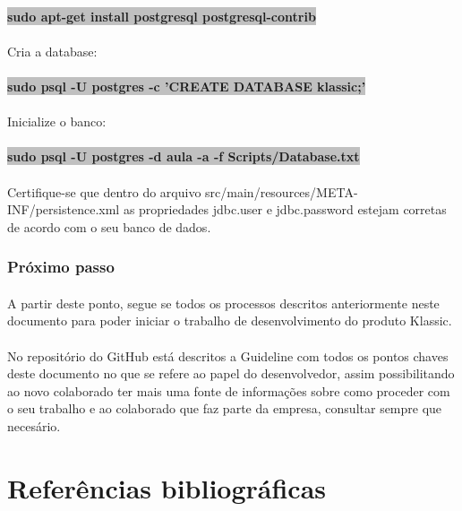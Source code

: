 \documentclass[	DIV=calc,%
							paper=a4,%
							fontsize=12pt,%
							onecolumn]{scrartcl}	 					%
\begin{document}
\paragraph{}
\textbf{\colorbox{Silver}{sudo apt-get install postgresql postgresql-contrib}}
\paragraph{}
Cria a database:
\paragraph{}
\textbf{\colorbox{Silver}{sudo psql -U postgres -c ’CREATE DATABASE klassic;’}}
\paragraph{}
Inicialize o banco:
\paragraph{}
\textbf{\colorbox{Silver}{sudo psql -U postgres -d aula -a -f Scripts/Database.txt}}
\paragraph{}
Certifique-se que dentro do arquivo src/main/resources/META-INF/persistence.xml as
propriedades jdbc.user e jdbc.password estejam corretas de acordo com o seu banco de
dados.
\subsubsection{Próximo passo}
\paragraph{}
A partir deste ponto, segue se todos os processos descritos anteriormente neste documento para poder iniciar o trabalho de desenvolvimento do produto Klassic.
\paragraph{}
No repositório do GitHub está descritos a Guideline com todos os pontos chaves deste documento no que se refere ao papel do desenvolvedor, assim possibilitando ao novo colaborado ter mais uma fonte de informações sobre como proceder com o seu trabalho e ao colaborado que faz parte da empresa, consultar sempre que necesário.

\newpage
\section{Referências bibliográficas}

 
\end{document}
